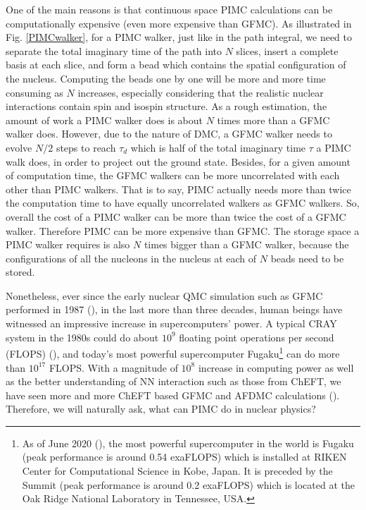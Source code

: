 \documentclass[12pt,letterpaper,UTF8]{report}
\begin{document}
One of the main reasons is that continuous space PIMC calculations can be computationally expensive (even more expensive than GFMC).
As illustrated in Fig. \ref{PIMCwalker}, for a PIMC walker,  just like in the path integral, we need to separate the total imaginary time of the path into $N$ slices, insert a complete basis at each slice, and form a bead which contains the spatial configuration of the nucleus. Computing the beads one by one will be more and more time consuming as $N$ increases,
especially considering that the realistic nuclear interactions contain spin and isospin structure.
As a rough estimation, the amount of work a PIMC walker does is about $N$ times more than a GFMC walker does.
However, due to the nature of DMC, a GFMC walker needs to evolve $N/2$ steps to reach $\tau_d$ which is half of the total imaginary time $\tau$ a PIMC walk does, in order to project out the ground state.
Besides, for a given amount of computation time, the GFMC walkers can be more uncorrelated with each other than PIMC walkers. That is to say, PIMC actually needs more than twice the computation time to have equally uncorrelated walkers as GFMC walkers.
So, overall the cost of a PIMC walker can be more than twice the cost of a GFMC walker.
Therefore PIMC can be more expensive than GFMC.
The storage space a PIMC walker requires is also $N$ times bigger than a GFMC walker, because the configurations of all the nucleons in the nucleus at each of $N$ beads need to be stored.

Nonetheless, ever since the early nuclear QMC simulation such as GFMC performed in 1987 (\cite{Carlson87a}), in the last more than three decades, human beings have witnessed an impressive increase in supercomputers' power. A typical CRAY system in the 1980s could do about $10^9$ floating point operations per second (FLOPS) (\cite{ChodoshEVO1946}),
and today's most powerful supercomputer Fugaku\footnote{As of June 2020 (\cite{wiki:Fugaku2020}), the most powerful supercomputer in the world is Fugaku (peak performance is around 0.54 exaFLOPS) which is installed at RIKEN Center for Computational Science in Kobe, Japan. It is preceded by the Summit (peak performance is around 0.2 exaFLOPS) which is located at the Oak Ridge National Laboratory in Tennessee, USA.}
can do more than $10^{17}$ FLOPS.
With a magnitude of $10^8$ increase in computing power as well as the better understanding of NN interaction such as those from ChEFT, we have seen more and more ChEFT based GFMC and AFDMC calculations (\cite{Lynn14a,Gerzerlis14a,Lynn2017PRC,Lonardoni2018PRL,Lonardoni2018PRC}).
Therefore, we will naturally ask, what can PIMC do in nuclear physics?
\end{document}
